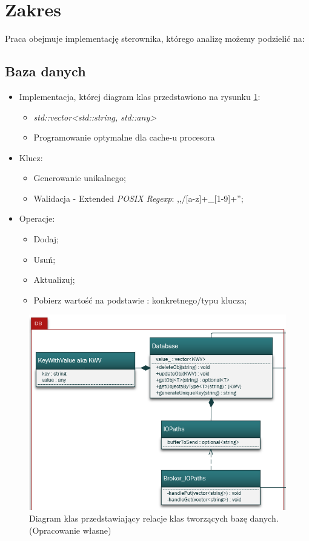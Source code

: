 \section{Zakres}
Praca obejmuje implementację sterownika, którego analizę możemy podzielić na:

\subsection{Baza danych}
\begin{itemize}
	\item Implementacja, której diagram klas przedstawiono na rysunku \ref{fig:DiagramKlas_DB}:
	\begin{itemize}
		\item \textit{std::vector<std::string, std::any>}
		\item Programowanie optymalne dla cache-u procesora
	\end{itemize}
	\item Klucz:
	\begin{itemize}
		\item Generowanie unikalnego;
		\item Walidacja - Extended \textit{POSIX Regexp}: ,,/[a-z]+\_[1-9]+'';
	\end{itemize}
	\item Operacje:
	\begin{itemize}
		\item Dodaj;
		\item Usuń;
		\item Aktualizuj;
		\item Pobierz wartość na podstawie : konkretnego/typu klucza;
	\end{itemize}
\end{itemize}
\begin{figure}[h!]
    \centering
    \includegraphics[scale=0.90]{Obrazki/DiagramyKlas/DB.png}
    \caption{Diagram klas przedstawiający relacje klas tworzących bazę danych.
        \newline(Opracowanie własne)}
	\label{fig:DiagramKlas_DB}
\end{figure}

